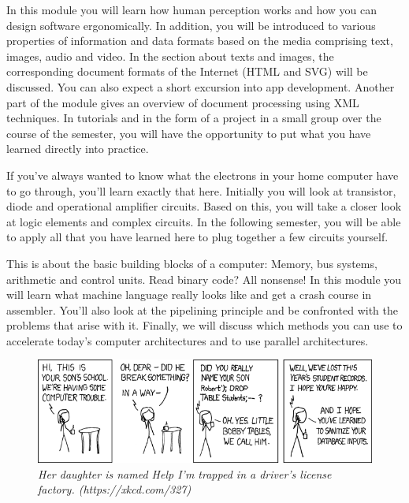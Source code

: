\newpage

\label{lec:emi}
In this module you will learn how human perception works and how you can design software ergonomically.
In addition, you will be introduced to various properties of information and data formats based on the media comprising text, images, audio and video.
In the section about texts and images, the corresponding document formats of the Internet (HTML and SVG) will be discussed.
You can also expect a short excursion into app development.
Another part of the module gives an overview of document processing using XML techniques.
In tutorials and in the form of a project in a small group over the course of the semester, you will have the opportunity to put what you have learned directly into practice.

If you've always wanted to know what the electrons in your home computer have to go through, you'll learn exactly that here.
Initially you will look at transistor, diode and operational amplifier circuits.
Based on this, you will take a closer look at logic elements and complex circuits.
In the following semester, you will be able to apply all that you have learned here to plug together a few circuits yourself.

This is about the basic building blocks of a computer:
Memory, bus systems, arithmetic and control units.
Read binary code? All nonsense! In this module you will learn what machine language really looks like and get a crash course in assembler.
You'll also look at the pipelining principle and be confronted with the problems that arise with it.
Finally, we will discuss which methods you can use to accelerate today's computer architectures and to use parallel architectures.

\vfill

\begin{figure}[h!]
\centering
\includegraphics[scale=.5]{img/xkcd/exploits_of_a_mom.png}
\caption*{{\small \textit{Her daughter is named Help I'm trapped in a driver's license factory. (https://xkcd.com/327)}}}
\end{figure}

